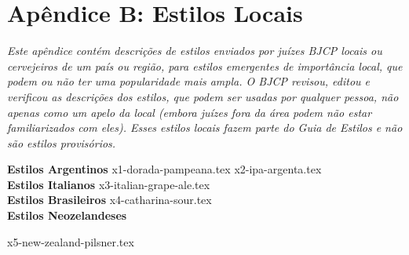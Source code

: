 \clearpage
{}
\divisorLine
\section*{Apêndice B: Estilos Locais}

\textit{Este apêndice contém descrições de estilos enviados por juízes BJCP locais ou cervejeiros de um país ou região, para estilos emergentes de importância local, que podem ou não ter uma popularidade mais ampla. O BJCP revisou, editou e verificou as descrições dos estilos, que podem ser usadas por qualquer pessoa, não apenas como um apelo da local (embora juízes fora da área podem não estar familiarizados com eles). Esses estilos locais fazem parte do Guia de Estilos e não são estilos provisórios.}

\begin{multicols}{2}

  \textbf{\Large\color{blue}Estilos Argentinos }
  {x1-dorada-pampeana.tex}
	{x2-ipa-argenta.tex}\\

  \textbf{\Large\color{blue}Estilos Italianos }
	{x3-italian-grape-ale.tex}\\

  \textbf{\Large\color{blue}Estilos Brasileiros }
	{x4-catharina-sour.tex}\\

  \textbf{\Large\color{blue}Estilos Neozelandeses }

	{x5-new-zealand-pilsner.tex}

\end{multicols}
